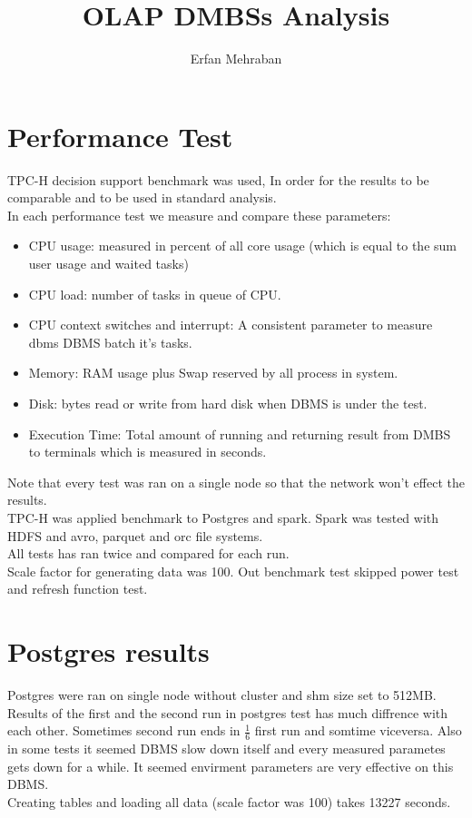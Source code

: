 \documentclass{article}
\author{Erfan Mehraban}
\title{OLAP DMBSs Analysis}
\begin{document}
    \maketitle

    
    
    
    \section{Performance Test}
    TPC-H decision support benchmark was used, In order for  the results to be comparable and to be used in standard analysis.\\
    In each performance test we measure and compare these parameters:
    \begin{itemize}
        \item
        CPU usage: measured in percent of all core usage (which is equal to the sum user usage and waited tasks)
        \item
        CPU load: number of tasks in queue of CPU.
        \item
        CPU context switches and interrupt: A consistent parameter to measure dbms DBMS batch it's tasks.
        \item
        Memory: RAM usage plus Swap reserved by all process in system.
        \item
        Disk: bytes read or write from hard disk when DBMS is under the test.
        \item
        Execution Time: Total amount of running and returning result from DMBS to terminals which is measured in seconds.
    \end{itemize}
    Note that every test was ran on a single node so that the network won't effect the results.\\
    TPC-H was applied benchmark to Postgres and spark. Spark was tested with HDFS and avro, parquet and orc file systems.\\
    All tests has ran twice and compared for each run.\\
    Scale factor for generating data was 100.
    Out benchmark test skipped power test and refresh function test.
    \pagebreak

    \section{Postgres results}
    Postgres were ran on single node without cluster and shm size set to 512MB.\\
    Results of the first and the second run in postgres test has much diffrence with each other. Sometimes second run ends in $\frac{1}{6}$ first run and somtime viceversa. Also in some tests it seemed DBMS slow down itself and every measured parametes gets down for a while. It seemed envirment parameters are very effective on this DBMS.\\
    Creating tables and loading all data (scale factor was 100) takes 13227 seconds.\\
    \pagebreak
    
\end{document}
